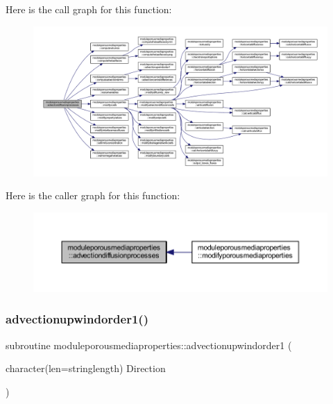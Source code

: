 Here is the call graph for this function\+:\nopagebreak
\begin{figure}[H]
\begin{center}
\leavevmode
\includegraphics[width=350pt]{namespacemoduleporousmediaproperties_ab176bef10683035ac59beb9b6b893728_cgraph}
\end{center}
\end{figure}
Here is the caller graph for this function\+:\nopagebreak
\begin{figure}[H]
\begin{center}
\leavevmode
\includegraphics[width=350pt]{namespacemoduleporousmediaproperties_ab176bef10683035ac59beb9b6b893728_icgraph}
\end{center}
\end{figure}
\mbox{\label{namespacemoduleporousmediaproperties_ab1e6a246ea1f6819438e21e75cf2de59}} 
\subsubsection{\texorpdfstring{advectionupwindorder1()}{advectionupwindorder1()}}
{\footnotesize\ttfamily subroutine moduleporousmediaproperties\+::advectionupwindorder1 (\begin{DoxyParamCaption}\item[{character(len=stringlength)}]{Direction }\end{DoxyParamCaption})\hspace{0.3cm}{\ttfamily [private]}}

